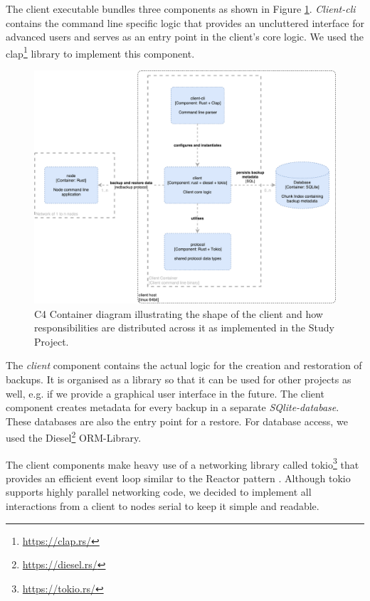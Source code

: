 The client executable bundles three components as shown in Figure \ref{fig:c4-client-container}. \emph{Client-cli} contains the command line specific logic that provides an uncluttered interface for advanced users and serves as an entry point in the client's core logic. We used the clap\footnote{\url{https://clap.rs/}}  library to implement this component.

\begin{figure}[h]
	\centering
	\includegraphics[width=1\linewidth]{resources/c4-client-container}
	\caption[Client specific C4 Container diagram]{C4 Container diagram illustrating the shape of the client and how responsibilities are distributed across it as implemented in the Study Project.}
	\label{fig:c4-client-container}
\end{figure}

The \emph{client} component contains the actual logic for the creation and restoration of backups. It is organised as a library so that it can be used for other projects as well, e.g. if we provide a graphical user interface in the future. The client component creates metadata for every backup in a separate \emph{SQlite-database}. These databases are also the entry point for a restore. For database access, we used the Diesel\footnote{\url{https://diesel.rs/}} ORM-Library.

The \gls{client} components make heavy use of a networking library called tokio\footnote{\url{https://tokio.rs/}} that provides an efficient event loop similar to the Reactor pattern \cite{POSA1}. Although tokio supports highly parallel networking code, we decided to implement all interactions from a \gls{client} to \glspl{node} serial to keep it simple and readable.

